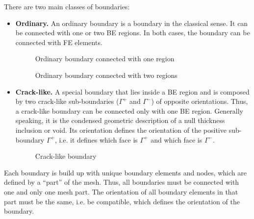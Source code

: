 \documentclass[a4paper,fleqn]{book}
\begin{document}
There are two main classes of boundaries:
\begin{itemize}
  \item \textbf{Ordinary.} An ordinary boundary is a boundary in the classical sense. It can be connected with one or two BE regions. In both cases, the boundary can be connected with FE elements.

  \begin{minipage}[b]{\linewidth}
    \centering
    \begin{minipage}[t]{0.28\linewidth}
      \begin{figure}[H]
      \centering
      
      \caption{Ordinary boundary connected with one region}
      \end{figure}
    \end{minipage}
    \begin{minipage}[t]{0.71\linewidth}
      \begin{figure}[H]
      \centering
      
      \caption{Ordinary boundary connected with two regions\label{fig:ordinary_boundary_interface}}
      \end{figure}
    \end{minipage}
  \end{minipage}

  \item \textbf{Crack-like.} A special boundary that lies inside a BE region and is composed by two crack-like sub-boundaries ($\Gamma^+$ and $\Gamma^-$) of opposite orientations. Thus, a crack-like boundary can be connected only with one BE region. Generally speaking, it is the condensed geometric description of a null thickness inclusion or void. Its orientation defines the orientation of the positive sub-boundary $\Gamma^+$, i.e. it defines which face is $\Gamma^+$ and which face is $\Gamma^-$.
  
  \begin{minipage}[b]{\linewidth}
    \centering
    \begin{figure}[H]
      \centering
      
      \caption{Crack-like boundary}
    \end{figure}
  \end{minipage}
\end{itemize}

Each boundary is build up with unique boundary elements and nodes, which are defined by a ``part'' of the mesh. Thus, all boundaries must be connected with one and only one mesh part. The orientation of all boundary elements in that part must be the same, i.e. be compatible, which defines the orientation of the boundary.
\end{document}
